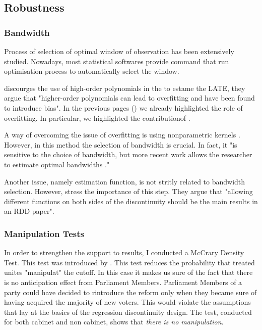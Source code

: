 
\subsection{Robustness}
\subsubsection{Bandwidth}
Process of selection of optimal window of observation has been extensively studied. Nowadays, most statistical softwares provide command that run optimisation process to automatically select the window.

\vspace*{1em}
\textcite{imbensIdentificationEstimationLocal1994} discourges the use of high-order polynomials in the to estame the LATE, they argue that "higher-order polynomials can lead to overfitting and have been found to introduce bias". In the previous pages (\label{sec:overfitting}) we already highlighted the role of overfitting. In particular, we highlighted the contributionof \textcite{cranmerWhatCanWe2017}.

A way of overcoming the issue of overfitting is using nonparametric kernels \parencite[chap.\(\backsim\) 6.2.3]{cunninghamCausalInferenceMixtape2021}. However, in this method the selection of bandwidth is crucial. In fact, it "is sensitive to the choice of bandwidth, but more recent work allows the researcher to estimate optimal bandwidths \textcite{imbensOptimalBandwidthChoice2012,calonicoRobustNonparametricConfidence2014}."

Another issue, namely estimation function, is not stritly related to bandwidth selection. However, \textcite{leeRegressionDiscontinuityDesigns2010} stress the importance of this step. They argue that "allowing different functions on both sides of the discontinuity should be the main results in an RDD paper".

\subsubsection{Manipulation Tests}
In order to strengthen the support to results, I conducted a McCrary Density Test. This test was introduced by \textcite{mccraryManipulationRunningVariable2008}. This test reduces the probability that treated unites "manipulat" the cutoff. In this case it makes us sure of the fact that there is no anticipation effect from Parliament Members. Parliament Members of a party could have decided to rintroduce the reform only when they became sure of having acquired the majority of new voters. This would violate the assumptions that lay at the basics of the regression discontinuity design.
The test, conducted for both cabinet and non cabinet, shows that \textit{there is no manipulation}.

